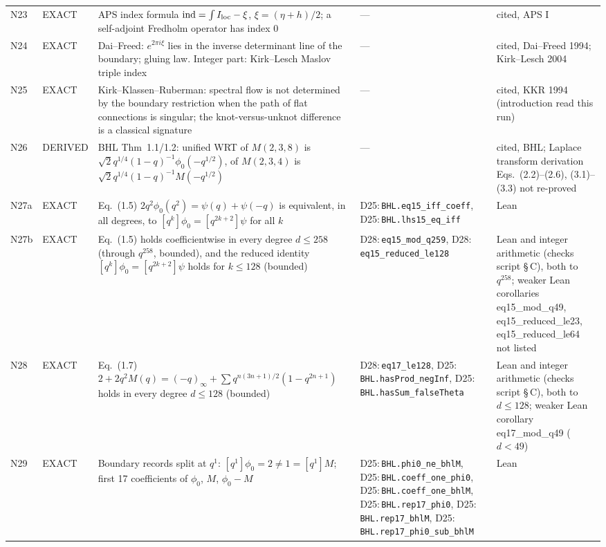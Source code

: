 \documentclass[11pt]{article}
\theoremstyle{definition}
\newcommand{\lean}[1]{\texttt{\small #1}}
\begin{document}
{\begin{longtable}{@{}L{0.05\textwidth}L{0.12\textwidth}L{0.26\textwidth}L{0.27\textwidth}L{0.17\textwidth}@{}}
N23 & EXACT & APS index formula $\operatorname{ind}=\int I_{\rm loc}-\xi$, $\xi=(\eta+h)/2$; a self-adjoint Fredholm operator has index $0$ & --- & cited, APS I\\
N24 & EXACT & Dai--Freed: $e^{2\pi i\xi}$ lies in the inverse determinant line of the boundary; gluing law. Integer part: Kirk--Lesch Maslov triple index & --- & cited, Dai--Freed 1994; Kirk--Lesch 2004\\
N25 & EXACT & Kirk--Klassen--Ruberman: spectral flow is not determined by the boundary restriction when the path of flat connections is singular; the knot-versus-unknot difference is a classical signature & --- & cited, KKR 1994 (introduction read this run)\\
N26 & DERIVED & BHL Thm~1.1/1.2: unified WRT of $M(2,3,8)$ is $\sqrt2q^{1/4}(1-q)^{-1}\phi_0(-q^{1/2})$, of $M(2,3,4)$ is $\sqrt2q^{1/4}(1-q)^{-1}M(-q^{1/2})$ & --- & cited, BHL; Laplace transform derivation Eqs.~(2.2)--(2.6), (3.1)--(3.3) not re-proved\\
N27a & EXACT & Eq.~(1.5) $2q^2\phi_0(q^2)=\psi(q)+\psi(-q)$ is equivalent, in all degrees, to $[q^k]\phi_0=[q^{2k+2}]\psi$ for all $k$ & D25:\,\lean{BHL.\allowbreak{}eq15\_\allowbreak{}iff\_\allowbreak{}coeff}, D25:\,\lean{BHL.\allowbreak{}lhs15\_\allowbreak{}eq\_\allowbreak{}iff} & Lean\\
N27b & EXACT & Eq.~(1.5) holds coefficientwise in every degree $d\le258$ (through $q^{258}$, bounded), and the reduced identity $[q^k]\phi_0=[q^{2k+2}]\psi$ holds for $k\le128$ (bounded) & D28:\,\lean{eq15\_\allowbreak{}mod\_\allowbreak{}q259}, D28:\,\lean{eq15\_\allowbreak{}reduced\_\allowbreak{}le128} & Lean and integer arithmetic (checks script \S\,C), both to $q^{258}$; weaker Lean corollaries eq15\_\allowbreak{}mod\_\allowbreak{}q49, eq15\_\allowbreak{}reduced\_\allowbreak{}le23, eq15\_\allowbreak{}reduced\_\allowbreak{}le64 not listed\\
N28 & EXACT & Eq.~(1.7) $2+2q^2M(q)=(-q)_\infty+\sum q^{n(3n+1)/2}(1-q^{2n+1})$ holds in every degree $d\le128$ (bounded) & D28:\,\lean{eq17\_\allowbreak{}le128}, D25:\,\lean{BHL.\allowbreak{}hasProd\_\allowbreak{}negInf}, D25:\,\lean{BHL.\allowbreak{}hasSum\_\allowbreak{}falseTheta} & Lean and integer arithmetic (checks script \S\,C), both to $d\le128$; weaker Lean corollary eq17\_\allowbreak{}mod\_\allowbreak{}q49 ($d<49$)\\
N29 & EXACT & Boundary records split at $q^1$: $[q^1]\phi_0=2\neq1=[q^1]M$; first 17 coefficients of $\phi_0$, $M$, $\phi_0-M$ & D25:\,\lean{BHL.\allowbreak{}phi0\_\allowbreak{}ne\_\allowbreak{}bhlM}, D25:\,\lean{BHL.\allowbreak{}coeff\_\allowbreak{}one\_\allowbreak{}phi0}, D25:\,\lean{BHL.\allowbreak{}coeff\_\allowbreak{}one\_\allowbreak{}bhlM}, D25:\,\lean{BHL.\allowbreak{}rep17\_\allowbreak{}phi0}, D25:\,\lean{BHL.\allowbreak{}rep17\_\allowbreak{}bhlM}, D25:\,\lean{BHL.\allowbreak{}rep17\_\allowbreak{}phi0\_\allowbreak{}sub\_\allowbreak{}bhlM} & Lean\\

\end{longtable}}
\end{document}
